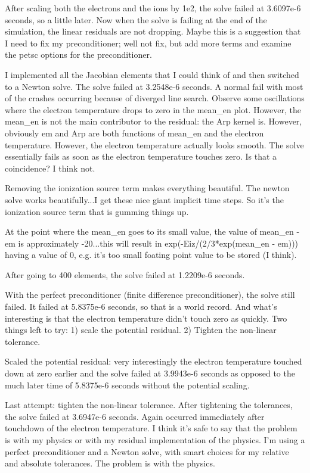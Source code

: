 After scaling both the electrons and the ions by 1e2, the solve failed at 3.6097e-6 seconds, so a little later. Now when the solve is failing at the end of the simulation, the linear residuals are not dropping. Maybe this is a suggestion that I need to fix my preconditioner; well not fix, but add more terms and examine the petsc options for the preconditioner.

I implemented all the Jacobian elements that I could think of and then switched to a Newton solve. The solve failed at 3.2548e-6 seconds. A normal fail with most of the crashes occurring because of diverged line search. Observe some oscillations where the electron temperature drops to zero in the mean_en plot. However, the mean_en is not the main contributor to the residual: the Arp kernel is. However, obviously em and Arp are both functions of mean_en and the electron temperature. However, the electron temperature actually looks smooth. The solve essentially fails as soon as the electron temperature touches zero. Is that a coincidence? I think not.

Removing the ionization source term makes everything beautiful. The newton solve works beautifully...I get these nice giant implicit time steps. So it's the ionization source term that is gumming things up.

At the point where the mean_en goes to its small value, the value of mean_en - em is approximately -20...this will result in exp(-Eiz/(2/3*exp(mean_en - em))) having a value of 0, e.g. it's too small foating point value to be stored (I think).

After going to 400 elements, the solve failed at 1.2209e-6 seconds.

With the perfect preconditioner (finite difference preconditioner), the solve still failed. It failed at 5.8375e-6 seconds, so that is a world record. And what's interesting is that the electron temperature didn't touch zero as quickly. Two things left to try: 1) scale the potential residual. 2) Tighten the non-linear tolerance.

Scaled the potential residual: very interestingly the electron temperature touched down at zero earlier and the solve failed at 3.9943e-6 seconds as opposed to the much later time of 5.8375e-6 seconds without the potential scaling.

Last attempt: tighten the non-linear tolerance. After tightening the tolerances, the solve failed at 3.6947e-6 seconds. Again occurred immediately after touchdown of the electron temperature. I think it's safe to say that the problem is with my physics or with my residual implementation of the physics. I'm using a perfect preconditioner and a Newton solve, with smart choices for my relative and absolute tolerances. The problem is with the physics.

